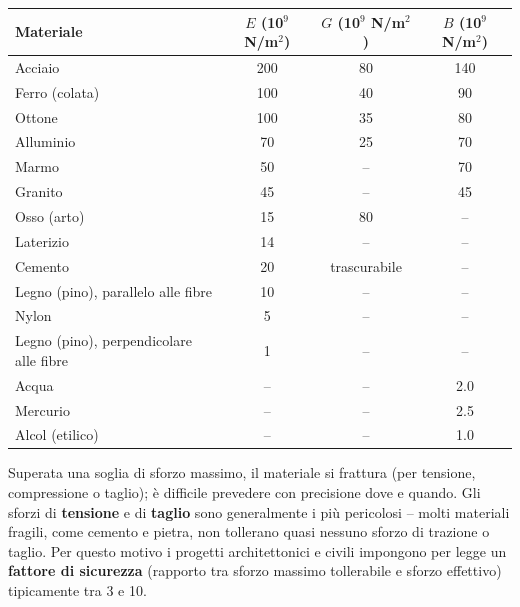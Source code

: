 \documentclass[a4paper,11pt]{article}
\begin{document}
\begin{center}
\small
\begin{tabular}{lccc}
\toprule
\textbf{Materiale} & $E$ (10$^9$ N/m$^2$) & $G$ (10$^9$ N/m$^2$) & $B$ (10$^9$ N/m$^2$) \\
\midrule
Acciaio & 200 & 80 & 140 \\
Ferro (colata) & 100 & 40 & 90 \\
Ottone & 100 & 35 & 80 \\
Alluminio & 70 & 25 & 70 \\
Marmo & 50 & -- & 70 \\
Granito & 45 & -- & 45 \\
Osso (arto) & 15 & 80 & -- \\
Laterizio & 14 & -- & -- \\
Cemento & 20 & trascurabile & -- \\
Legno (pino), parallelo alle fibre & 10 & -- & -- \\
Nylon & 5 & -- & -- \\
Legno (pino), perpendicolare alle fibre & 1 & -- & -- \\
Acqua & -- & -- & 2.0 \\
Mercurio & -- & -- & 2.5 \\
Alcol (etilico) & -- & -- & 1.0 \\
\bottomrule
\end{tabular}
\end{center}

Superata una soglia di sforzo massimo, il materiale si frattura (per tensione, compressione o taglio); è difficile prevedere con precisione dove e quando. Gli sforzi di \textbf{tensione} e di \textbf{taglio} sono generalmente i più pericolosi -- molti materiali fragili, come cemento e pietra, non tollerano quasi nessuno sforzo di trazione o taglio. Per questo motivo i progetti architettonici e civili impongono per legge un \textbf{fattore di sicurezza} (rapporto tra sforzo massimo tollerabile e sforzo effettivo) tipicamente tra 3 e 10.
\end{document}
